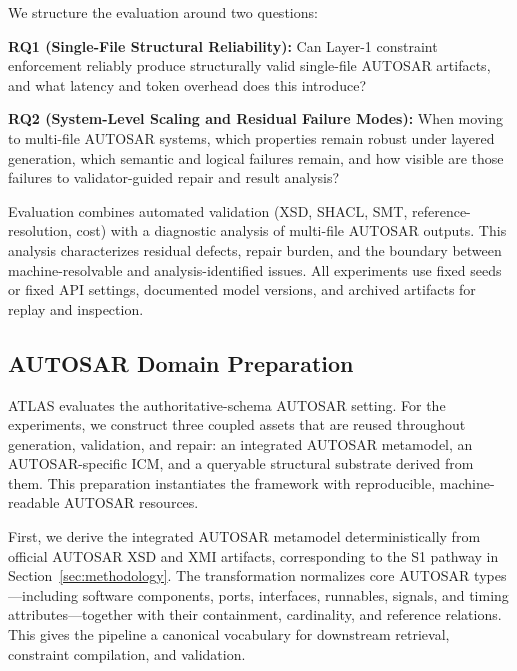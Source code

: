 \documentclass[acmlarge,nonacm]{acmart}
\theoremstyle{acmplain}
\theoremstyle{acmdefinition}
\begin{document}
We structure the evaluation around two questions:

\noindent \textbf{RQ1 (Single-File Structural Reliability):} Can Layer-1 constraint enforcement reliably produce structurally valid single-file AUTOSAR artifacts, and what latency and token overhead does this introduce?

\noindent \textbf{RQ2 (System-Level Scaling and Residual Failure Modes):} When moving to multi-file AUTOSAR systems, which properties remain robust under layered generation, which semantic and logical failures remain, and how visible are those failures to validator-guided repair and result analysis?

Evaluation combines automated validation (XSD, SHACL, SMT, reference-resolution, cost) with a diagnostic analysis of multi-file AUTOSAR outputs. This analysis characterizes residual defects, repair burden, and the boundary between machine-resolvable and analysis-identified issues. All experiments use fixed seeds or fixed API settings, documented model versions, and archived artifacts for replay and inspection.


\subsection{AUTOSAR Domain Preparation}
\label{sec:autosar-domain-setup}

ATLAS evaluates the authoritative-schema AUTOSAR setting. For the experiments, we construct three coupled assets that are reused throughout generation, validation, and repair: an integrated AUTOSAR metamodel, an AUTOSAR-specific ICM, and a queryable structural substrate derived from them. This preparation instantiates the framework with reproducible, machine-readable AUTOSAR resources.

First, we derive the integrated AUTOSAR metamodel deterministically from official AUTOSAR XSD and XMI artifacts, corresponding to the S1 pathway in Section~\ref{sec:methodology}. The transformation normalizes core AUTOSAR types---including software components, ports, interfaces, runnables, signals, and timing attributes---together with their containment, cardinality, and reference relations. This gives the pipeline a canonical vocabulary for downstream retrieval, constraint compilation, and validation.
\end{document}
